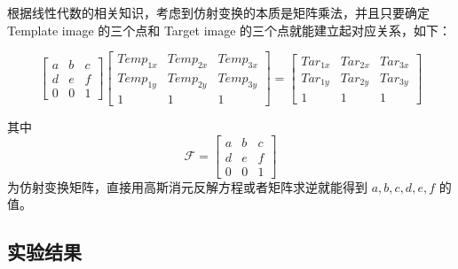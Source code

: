\documentclass[a4paper]{article}
\begin{document}
根据线性代数的相关知识，考虑到仿射变换的本质是矩阵乘法，并且只要确定 Template image 的三个点和 Target image 的三个点就能建立起对应关系，如下：

$$
\begin{bmatrix}a&b&c \\ d&e&f \\ 0&0&1\end{bmatrix}
\begin{bmatrix}Temp_{1x}&Temp_{2x}&Temp_{3x}\\Temp_{1y}&Temp_{2y}&Temp_{3y}\\1&1&1\end{bmatrix}
=
\begin{bmatrix}Tar_{1x}&Tar_{2x}&Tar_{3x}\\Tar_{1y}&Tar_{2y}&Tar_{3y}\\1&1&1\end{bmatrix}
$$

其中 $$\mathcal{F}=\begin{bmatrix}a&b&c \\ d&e&f \\ 0&0&1\end{bmatrix}$$ 为仿射变换矩阵，直接用高斯消元反解方程或者矩阵求逆就能得到 $a,b,c,d,e,f$ 的值。

\subsection{实验结果}
\end{document}
